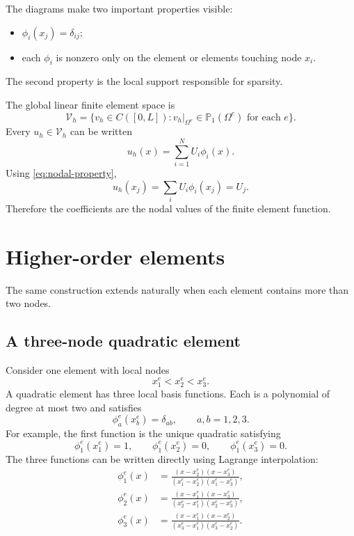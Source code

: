 \documentclass[11pt]{article}
\newcommand{\Om}{\Omega}
\newcommand{\Vh}{\mathcal{V}_h}
\newcommand{\Pp}{\mathbb{P}}
\begin{document}
The diagrams make two important properties visible:
\begin{itemize}
\item $\phi_i(x_j)=\delta_{ij}$;
\item each $\phi_i$ is nonzero only on the element or elements touching node
      $x_i$.
\end{itemize}
The second property is the local support responsible for sparsity.

The global linear finite element space is
\[
\Vh
=
\{v_h\in C([0,L]):v_h|_{\Om^e}\in\Pp_1(\Om^e)
\text{ for each }e\}.
\]
Every $u_h\in\Vh$ can be written
\begin{equation}
u_h(x)=\sum_{i=1}^{N}U_i\phi_i(x).
\label{eq:global-expansion}
\end{equation}
Using \eqref{eq:nodal-property},
\[
u_h(x_j)=\sum_i U_i\phi_i(x_j)=U_j.
\]
Therefore the coefficients are the nodal values of the finite element
function.

\section{Higher-order elements}

The same construction extends naturally when each element contains more than
two nodes.

\subsection{A three-node quadratic element}

Consider one element with local nodes
\[
x_1^e<x_2^e<x_3^e.
\]
A quadratic element has three local basis functions. Each is a polynomial of
degree at most two and satisfies
\[
\phi_a^e(x_b^e)=\delta_{ab},\qquad a,b=1,2,3.
\]
For example, the first function is the unique quadratic satisfying
\[
\phi_1^e(x_1^e)=1,
\qquad
\phi_1^e(x_2^e)=0,
\qquad
\phi_1^e(x_3^e)=0.
\]
The three functions can be written directly using Lagrange interpolation:
\begin{align}
\phi_1^e(x)
&=\frac{(x-x_2^e)(x-x_3^e)}{(x_1^e-x_2^e)(x_1^e-x_3^e)},\\
\phi_2^e(x)
&=\frac{(x-x_1^e)(x-x_3^e)}{(x_2^e-x_1^e)(x_2^e-x_3^e)},\\
\phi_3^e(x)
&=\frac{(x-x_1^e)(x-x_2^e)}{(x_3^e-x_1^e)(x_3^e-x_2^e)}.
\label{eq:quadratic-physical}
\end{align}

\begin{center}
\end{center}
\end{document}
